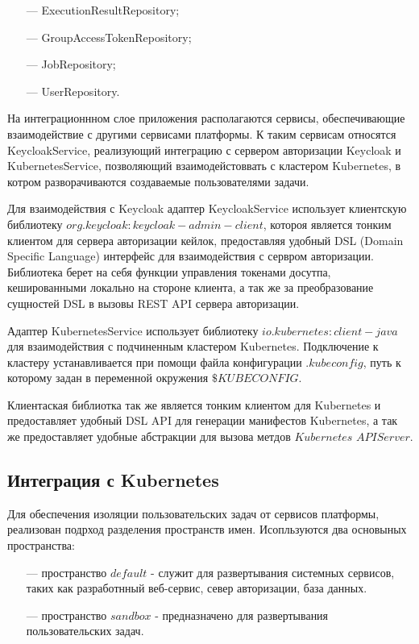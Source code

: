 \begin{itemize}
\item[---] ExecutionResultRepository;
\item[---] GroupAccessTokenRepository;
\item[---] JobRepository;
\item[---] UserRepository.
\end{itemize}

На интеграционнном слое приложения располагаются сервисы, обеспечивающие взаимодействие с другими сервисами платформы. К таким сервисам относятся KeycloakService, реализующий интеграцию с сервером авторизации Keycloak и KubernetesService, позволяющий взаимодейстоввать с кластером Kubernetes, в котром разворачиваются создаваемые пользователями задачи.

Для взаимодействия с Keycloak адаптер KeycloakService использует клиентскую библиотеку $org.keycloak:keycloak-admin-client$, котороя является тонким клиентом для сервера авторизации кейлок, предоставляя удобный DSL (Domain Specific Language)\cite{mernik2005and} интерфейс для взаимодействия с сервром авторизации. Библиотека берет на себя функции управления токенами досутпа, кешированными локально на стороне клиента, а так же за преобразование сущностей DSL в вызовы REST API сервера авторизации.

Адаптер KubernetesService использует библиотеку $io.kubernetes:client-java$ для взаимодействия с подчиненным кластером Kubernetes. Подключение к кластеру устанавливается при помощи файла конфигурации $.kubeconfig$, путь к которому задан в переменной окружения $\$KUBECONFIG$.

Клиентаская библиотка так же является тонким клиентом для Kubernetes и предоставляет удобный DSL API для генерации манифестов Kubernetes\cite{poulton2023kubernetes}, а так же предоставляет удобные абстракции для вызова метдов $Kubernetes$ $API Server$.

\subsection{Интеграция с Kubernetes}

Для обеспечения изоляции пользовательских задач от сервисов платформы, реализован подрход разделения пространств имен.
Исопльзуются два основыных пространства:

\begin{itemize}
\item[---] пространство $default$ - служит для развертывания системных сервисов, таких как разработнный веб-сервис, север авторизации, база данных.
\item[---] пространство $sandbox$ - предназначено для развертывания пользовательских задач. 
\end{itemize}

